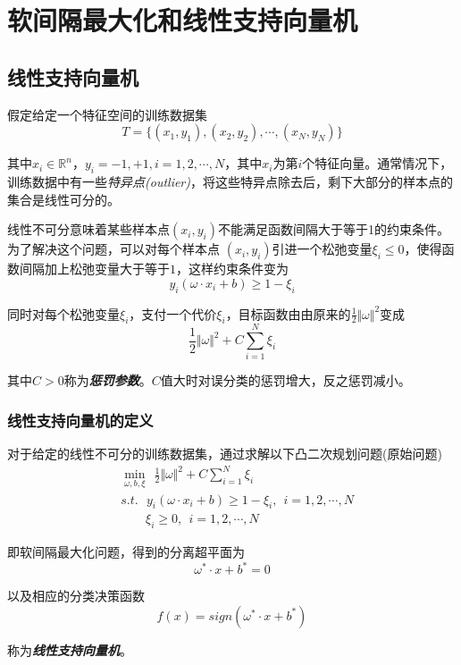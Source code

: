 \chapter{软间隔最大化和线性支持向量机}

\section{线性支持向量机}

假定给定一个特征空间的训练数据集
\begin{equation}
    T=\{(x_1,y_1),(x_2,y_2),\cdots,(x_N,y_N)\}
\end{equation}

其中$x_i\in \mathbb{R}^n$，$y_i={-1,+1},i=1,2,\cdots,N$，其中$x_i$为第$i$个特征向量。通常情况下，
训练数据中有一些\textsl{特异点(outlier)}，将这些特异点除去后，剩下大部分的样本点的集合是线性可分的。

线性不可分意味着某些样本点$(x_i,y_i)$不能满足函数间隔大于等于1的约束条件。为了解决这个问题，可以对每个样本点
$(x_i,y_i)$引进一个松弛变量$\xi_i\leqslant 0$，使得函数间隔加上松弛变量大于等于$1$，这样约束条件变为
\begin{equation}
    y_i(\omega\cdot x_i+b)\geqslant 1-\xi_i
\end{equation}

同时对每个松弛变量$\xi_i$，支付一个代价$\xi_i$，目标函数由由原来的$\frac{1}{2}\Vert \omega\Vert^2$变成
\begin{equation}
    \frac{1}{2}\Vert\omega\Vert^2+C\sum\limits_{i=1}^{N} \xi_i
\end{equation}

其中$C>0$称为\textbf{\textsl{惩罚参数}}。$C$值大时对误分类的惩罚增大，反之惩罚减小。

\subsection*{线性支持向量机的定义}
\begin{define}
    对于给定的线性不可分的训练数据集，通过求解以下凸二次规划问题(原始问题)
    \begin{equation}
        \begin{aligned}
            & \min\limits_{\omega,b,\xi}\ \  \frac{1}{2}\Vert\omega\Vert^2+C\sum\limits_{i=1}^{N}\xi_i\\
            & s.t. \ \ \ y_i(\omega\cdot x_i+b)\geqslant 1-\xi_i,\ \ i=1,2,\cdots,N\\
            & \ \ \ \ \ \ \ \ \ \xi_i\geqslant 0,\ \ i=1,2,\cdots,N
        \end{aligned}
    \end{equation}

    即软间隔最大化问题，得到的分离超平面为
    \begin{equation}
        \omega^*\cdot x+b^*=0
    \end{equation}

    以及相应的分类决策函数
    \begin{equation}
        f(x)=sign(\omega^*\cdot x+b^*)
    \end{equation}

    称为\textsl{\textbf{线性支持向量机}}。
\end{define}

